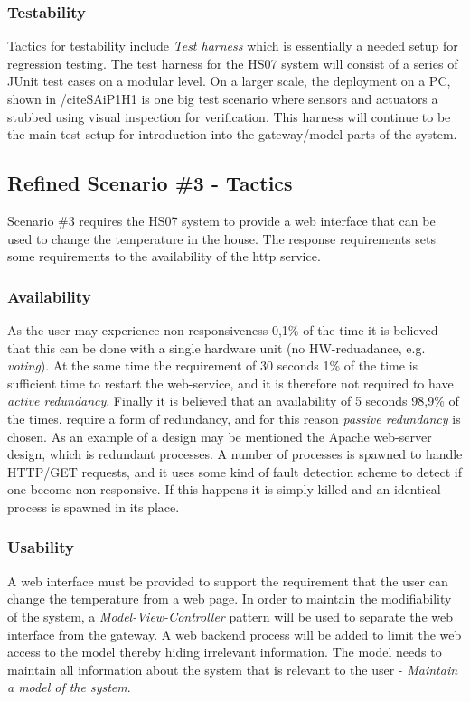 \documentclass[a4paper,10pt]{article}
\begin{document}
\subsubsection{Testability}
Tactics for testability include \emph{Test harness} which is essentially a needed setup for regression testing. The test harness for the HS07 system will consist of a series of JUnit test cases on a modular level. On a larger scale, the deployment on a PC, shown in /cite{SAiP1H1} is one big test scenario where sensors and actuators a stubbed using visual inspection for verification. This harness will continue to be the main test setup for introduction into the gateway/model parts of the system.
\subsection{Refined Scenario \#3 - Tactics}
Scenario \#3 requires the HS07 system to provide a web interface that can be used to change the temperature in the house. The response requirements sets some requirements to the availability of the http service.
\subsubsection{Availability}
As the user may experience non-responsiveness 0,1\% of the time it is believed that this can be done with a single hardware unit (no HW-reduadance, e.g. \emph{voting}). At the same time the requirement of 30 seconds 1\% of the time is sufficient time to restart the web-service, and it is therefore not required to have \emph{active redundancy}. Finally it is believed that an availability of 5 seconds 98,9\% of the times, require a form of redundancy, and for this reason \emph{passive redundancy} is chosen. As an example of a design may be mentioned the Apache web-server design, which is redundant processes. A number of processes is spawned to handle HTTP/GET requests, and it uses some kind of fault detection scheme to detect if one become non-responsive. If this happens it is simply killed and an identical process is spawned in its place.

\subsubsection{Usability}
A web interface must be provided to support the requirement that the user can change the temperature from a web page. In order to maintain the modifiability of the system, a \emph{Model-View-Controller} pattern will be used to separate the web interface from the gateway. A web backend process will be added to limit the web access to the model thereby hiding irrelevant information. The model needs to maintain all information about the system that is relevant to the user - \emph{Maintain a model of the system}.
\end{document}
